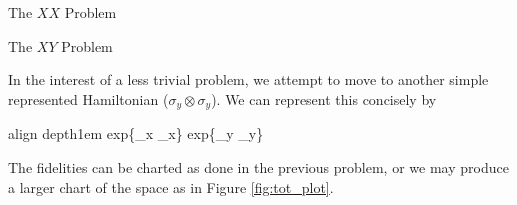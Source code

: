 \documentclass[12pt]{beamer}
\renewcommand{\maketitle}{%
	\begin{center}%
		\Huge\inserttitle\\[5mm]%
		\Large\insertauthor\\[5mm]%
		\Large\insertinstitute%
	\end{center}%
	\vspace*{-1.5ex}%
}
\newcommand*\mystrut[1]{\vrule width0pt height0pt depth#1\relax}
\begin{document}
\begin{frame}{\maketitle}
\begin{columns}
\begin{column}{.45\textwidth}
\begin{block}{The $XX$ Problem}
%
%
\end{block}

\begin{block}{The $XY$ Problem}

	In the interest of a less trivial problem, we attempt to move to another simple represented Hamiltonian ($\sigma_y \otimes \sigma_y$). We can represent this concisely by

	\begin{empheq}[box=\fbox]{align}
		\mystrut{1em} exp\{\sigma_x \otimes \sigma_x\} \mapsto exp\{\sigma_y \otimes \sigma_y\}
	\end{empheq}

	The fidelities can be charted as done in the previous problem, or we may produce a larger chart of the space as in Figure \ref{fig:tot_plot}. 


\end{block}
\end{column}
\end{columns}
\end{frame}
\end{document}
